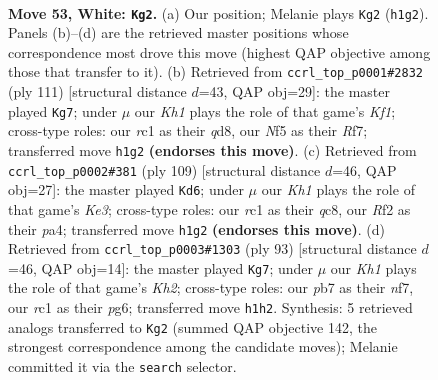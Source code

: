 \documentclass[11pt]{article}
\begin{document}
\clearpage

\begin{figure}[p]\centering
\begin{subfigure}{0.46\textwidth}\centering
\resizebox{\linewidth}{!}{%
\newchessgame
\chessboard[
  setfen={5nk1/1p2Q2p/8/5N1p/8/8/5R2/2r4K w - - 1 53},
  showmover=false,
  pgfstyle=straightmove, color=movearrow, markmove={h1-g2}
]}
\caption{}
\end{subfigure}\hfill
\begin{subfigure}{0.46\textwidth}\centering
\resizebox{\linewidth}{!}{%
\newchessgame
\chessboard[
  setfen={3Q1k2/5r2/8/8/4P1p1/8/2q3PP/6K1 b - - 8 56},
  showmover=false,
  pgfstyle=straightmove, color=movearrow, markmove={f8-g7}
]}
\caption{}
\end{subfigure}
\\[4pt]
\begin{subfigure}{0.46\textwidth}\centering
\resizebox{\linewidth}{!}{%
\newchessgame
\chessboard[
  setfen={2Q5/8/4k3/3n4/PP6/4q3/1KP5/8 b - - 8 55},
  showmover=false,
  pgfstyle=straightmove, color=movearrow, markmove={e6-d6}
]}
\caption{}
\end{subfigure}\hfill
\begin{subfigure}{0.46\textwidth}\centering
\resizebox{\linewidth}{!}{%
\newchessgame
\chessboard[
  setfen={8/5N1k/6P1/5KP1/1rP5/p7/6b1/3R4 b - - 0 47},
  showmover=false,
  pgfstyle=straightmove, color=movearrow, markmove={h7-g7}
]}
\caption{}
\end{subfigure}
\caption{\textbf{Move 53, White: \texttt{Kg2}.} (a) Our position; Melanie plays \texttt{Kg2} (\texttt{h1g2}). Panels (b)--(d) are the retrieved master positions whose correspondence most drove this move (highest QAP objective among those that transfer to it). (b) Retrieved from \texttt{ccrl\_top\_p0001\#2832} (ply 111) [structural distance $d$=43, QAP obj=29]: the master played \texttt{Kg7}; under $\mu$ our \emph{Kh1} plays the role of that game's \emph{Kf1}; cross-type roles: our \emph{r}c1 as their \emph{q}d8, our \emph{N}f5 as their \emph{R}f7; transferred move \texttt{h1g2} \textbf{(endorses this move)}. (c) Retrieved from \texttt{ccrl\_top\_p0002\#381} (ply 109) [structural distance $d$=46, QAP obj=27]: the master played \texttt{Kd6}; under $\mu$ our \emph{Kh1} plays the role of that game's \emph{Ke3}; cross-type roles: our \emph{r}c1 as their \emph{q}c8, our \emph{R}f2 as their \emph{p}a4; transferred move \texttt{h1g2} \textbf{(endorses this move)}. (d) Retrieved from \texttt{ccrl\_top\_p0003\#1303} (ply 93) [structural distance $d$=46, QAP obj=14]: the master played \texttt{Kg7}; under $\mu$ our \emph{Kh1} plays the role of that game's \emph{Kh2}; cross-type roles: our \emph{p}b7 as their \emph{n}f7, our \emph{r}c1 as their \emph{p}g6; transferred move \texttt{h1h2}. Synthesis: 5 retrieved analogs transferred to \texttt{Kg2} (summed QAP objective 142, the strongest correspondence among the candidate moves); Melanie committed it via the \texttt{search} selector.}
\label{fig:thought-m104}
\end{figure}
\end{document}
